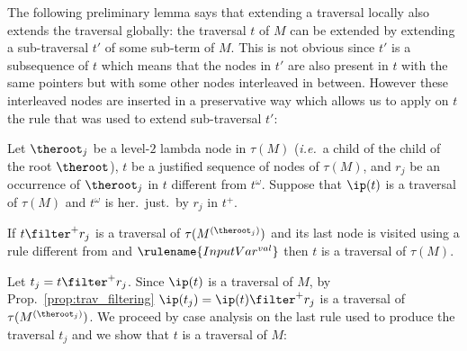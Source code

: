 The following preliminary lemma says that extending a traversal locally also extends the
traversal globally: the traversal $t$ of $M$ can be extended by
extending a sub-traversal $t'$ of some sub-term of $M$. This is
not obvious since $t'$ is a subsequence of $t$ which means that the
nodes in $t'$ are also present in $t$ with the same pointers but
with some other nodes interleaved in between. However these
interleaved nodes are inserted in a preservative way which allows us
to apply on $t$ the rule that was used to extend sub-traversal $t'$:
\begin{lemma}
\label{lem:subtraversal_progression} Let $\theroot_j$ be a level-$2$ lambda node in $\tau(M)$ ({\it i.e.}\ a child of the child of the root $\theroot$),
$t$ be a justified sequence of nodes of $\tau(M)$, and $r_j$ be an occurrence of $\theroot_j$ in $t$ different from $t^\omega$.
Suppose that $\ip(t)$ is a traversal of $\tau(M)$ and $t^\omega$ is her.\ just.\ by $r_j$ in $t^+$.

If $t \filter^+ r_j$ is a traversal of $\tau(M^{(\theroot_j)})$
and its last node is visited using a rule different from  and $\rulename{InputVar^{val}}$
then $t$ is a traversal of $\tau(M)$.
\end{lemma}
\proof
Let $t_j = t \filter^+ r_j$. Since $\ip(t)$ is a traversal of $M$, by Prop.\ \ref{prop:trav_filtering}
$\ip(t_j) = \ip(t) \filter^+ r_j$ is a traversal of $\tau(M^{(\theroot_j)})$.
  We proceed by case analysis on the last rule used to produce the traversal $t_j$ and we show that $t$ is a traversal of $M$:
